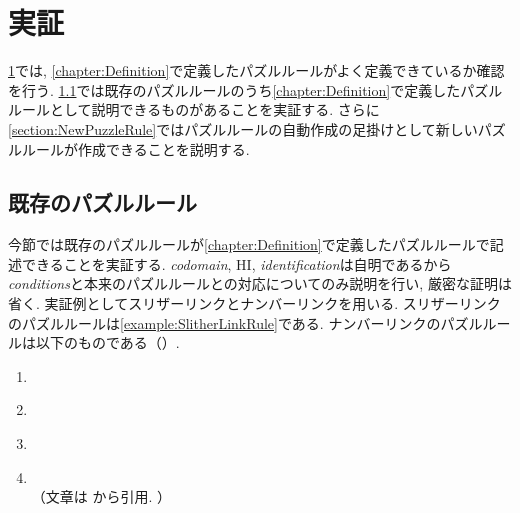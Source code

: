 \chapter{実証}\label{chapter:Demonstration}
\cref{chapter:Demonstration}では, \cref{chapter:Definition}で定義したパズルルールがよく定義できているか確認を行う. \cref{section:ExistsPuzzleRule}では既存のパズルルールのうち\cref{chapter:Definition}で定義したパズルルールとして説明できるものがあることを実証する. さらに\cref{section:NewPuzzleRule}ではパズルルールの自動作成の足掛けとして新しいパズルルールが作成できることを説明する.

\section{既存のパズルルール}\label{section:ExistsPuzzleRule}
今節では既存のパズルルールが\cref{chapter:Definition}で定義したパズルルールで記述できることを実証する. \textit{codomain}, HI, \textit{identification}は自明であるから\textit{conditions}と本来のパズルルールとの対応についてのみ説明を行い, 厳密な証明は省く.
実証例としてスリザーリンクとナンバーリンクを用いる. スリザーリンクのパズルルールは\cref{example:SlitherLinkRule}である. ナンバーリンクのパズルルールは以下のものである（\cite{web:NumberLink}）.
\begin{example}[ナンバーリンクのパズルルール]\label{example:NumberLinkRule}\textup{}
  \begin{enumerate}
    \item {}\label{NumberLinkRule_1}
    \item {}\\\label{NumberLinkRule_2}
    \item {}\label{NumberLinkRule_3}
    \item {}\\（文章は \cite{web:NumberLink}から引用. ）\label{NumberLinkRule_4}
  \end{enumerate}
\end{example}

